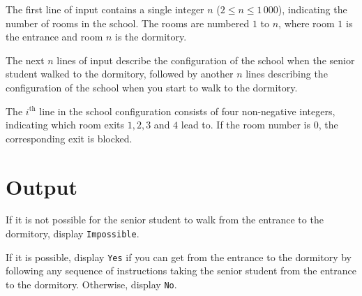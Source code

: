 The first line of input contains a single integer $n$ ($2 \leq n \leq 1\,000$),
indicating the number of rooms in the school.  The rooms are numbered
$1$ to $n$, where room $1$ is the entrance and room $n$ is the dormitory.

The next $n$ lines of input describe the configuration of the school when the
senior student walked to the dormitory, followed by another $n$ lines
describing the configuration of the school when you start to walk to the
dormitory.

The $i^\textrm{th}$ line in the school configuration consists of four
non-negative integers, indicating which room exits $1, 2, 3$ and $4$
lead to.  If the room number is $0$, the corresponding exit is
blocked.

\section*{Output}

If it is not possible for the senior student to walk from the entrance
to the dormitory, display \texttt{Impossible}.

If it is possible, display \texttt{Yes} if you can get from the entrance to
the dormitory by following any sequence of instructions
taking the senior student from the entrance to the dormitory.  Otherwise, display \texttt{No}.

